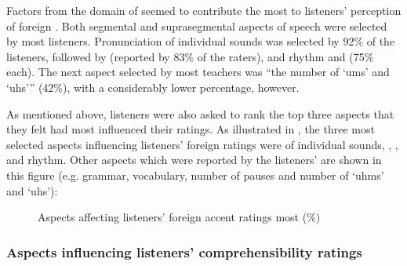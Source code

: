 \documentclass[output=paper]{langsci/langscibook}
\begin{document}
Factors from the domain of  seemed to contribute the most to listeners’ perception of foreign . Both segmental and suprasegmental aspects of speech were selected by most listeners. Pronunciation of individual sounds was selected by 92\% of the listeners, followed by  (reported by 83\% of the raters), and rhythm and  (75\% each). The next aspect selected by most teachers was “the number of ‘ums’ and ‘uhs’” (42\%), with a considerably lower percentage, however. 

As mentioned above, listeners were also asked to rank the top three aspects that they felt had most influenced their  ratings. As illustrated in , the three most selected aspects influencing listeners’ foreign  ratings were  of individual sounds, , , and rhythm. Other aspects which were reported by the listeners’ are shown in this figure (e.g. grammar, vocabulary, number of pauses and number of ‘uhms’ and ‘uhs’):

\begin{figure}
\caption{\label{fig:delrio:2} Aspects affecting listeners’ foreign accent ratings most (\%)}
\end{figure}
 

 
\subsubsection{Aspects influencing listeners’ comprehensibility ratings}
\end{document}
